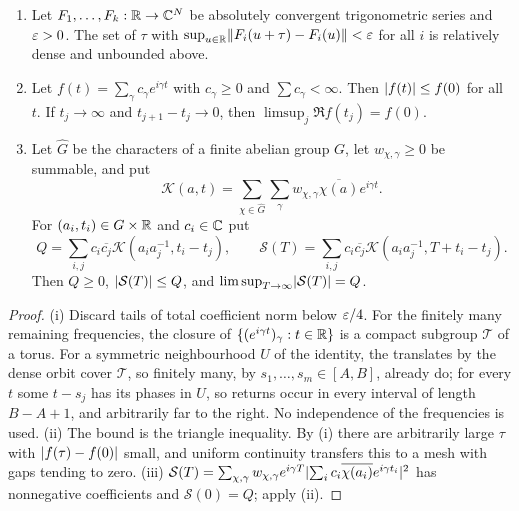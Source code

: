 \begin{lemma}\label{zer:lem:posspec}
\begin{enumerate}[label=\textup{(\roman*)}]
\item Let $F_1,\dots,F_k:\mathbb{R}\to\mathbb{C}^N$ be absolutely convergent trigonometric series and $\varepsilon>0$. The
set of $\tau$ with $\sup_{u\in\mathbb{R}}\lVert F_i(u+\tau)-F_i(u)\rVert<\varepsilon$ for all $i$ is relatively dense
and unbounded above.
\item Let $f(t)=\sum_\gamma c_\gamma e^{i\gamma t}$ with $c_\gamma\ge0$ and $\sum c_\gamma<\infty$.
Then $\lvert f(t)\rvert\le f(0)$ for all $t$. If $t_j\to\infty$ and $t_{j+1}-t_j\to0$, then
$\limsup_j\Re f(t_j)=f(0)$.
\item Let $\widehat G$ be the characters of a finite abelian group $G$, let
$w_{\chi,\gamma}\ge0$ be summable, and put
\[
 \mathcal K(a,t)=\sum_{\chi\in\widehat G}\sum_\gamma w_{\chi,\gamma}\overline{\chi(a)}e^{i\gamma t}.
\]
For $(a_i,t_i)\in G\times\mathbb{R}$ and $c_i\in\mathbb{C}$ put
\[
 Q=\sum_{i,j}c_i\overline{c_j}\mathcal K(a_ia_j^{-1},t_i-t_j),\qquad
 \mathcal S(T)=\sum_{i,j}c_i\overline{c_j}\mathcal K(a_ia_j^{-1},T+t_i-t_j).
\]
Then $Q\ge0$, $\lvert\mathcal S(T)\rvert\le Q$, and $\limsup_{T\to\infty}\lvert\mathcal S(T)\rvert=Q$.
\end{enumerate}
\end{lemma}
\begin{proof}
(i) Discard tails of total coefficient norm below $\varepsilon/4$. For the finitely many remaining
frequencies, the closure of $\{(e^{i\gamma t})_\gamma:t\in\mathbb{R}\}$ is a compact subgroup $\mathcal T$
of a torus. For a symmetric neighbourhood $U$ of the identity, the translates by the dense
orbit cover $\mathcal T$, so finitely many, by $s_1,\dots,s_m\in[A,B]$, already do; for every $t$
some $t-s_j$ has its phases in $U$, so returns occur in every interval of length $B-A+1$, and
arbitrarily far to the right. No independence of the frequencies is used. (ii) The bound is
the triangle inequality. By (i) there are arbitrarily large $\tau$ with $\lvert f(\tau)-f(0)\rvert$
small, and uniform continuity transfers this to a mesh with gaps tending to zero.
(iii) $\mathcal S(T)=\sum_{\chi,\gamma}w_{\chi,\gamma}e^{i\gamma T}\lvert\sum_ic_i\overline{\chi(a_i)}e^{i\gamma t_i}\rvert^2$
has nonnegative coefficients and $\mathcal S(0)=Q$; apply (ii).
\end{proof}

